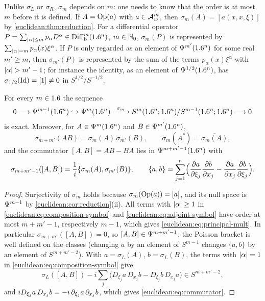 Unlike $\sigma_L$ or $\sigma_R$, $\sigma_m$ depends on $m$: one needs to
know that the order is at most $m$ before it is defined. If $A=\operatorname{Op}(a)$ with
$a\in\mathcal{A}^{m}_{w}$, then $\sigma_m(A)=[a(x,x,\xi)]$ by
\cref{euclidean:thm:reduction}. For a differential operator
$P=\sum_{\lvert \alpha\rvert\le m}p_\alpha D^\alpha\in\operatorname{Diff}^{m}_{\mathrm b}(1.6^n)$,
$m\in\mathbb{N}_0$, $\sigma_m(P)$ is represented by $\sum_{\lvert \alpha\rvert=m}p_\alpha(x)\xi^\alpha$.
If $P$ is only regarded as an element of $\Psi^{m'}(1.6^n)$ for some real
$m'\ge m$, then $\sigma_{m'}(P)$ is represented by the sum of the terms
$p_\alpha(x)\xi^\alpha$ with $\lvert \alpha\rvert>m'-1$; for instance the identity, as an
element of $\Psi^{1/2}(1.6^n)$, has $\sigma_{1/2}(\operatorname{Id})=[1]\ne0$ in
$S^{1/2}/S^{-1/2}$.

\begin{proposition}\label{euclidean:prop:symbol-sequence}
  For every $m\in1.6$ the sequence
  \begin{equation*}
    0\longrightarrow\Psido{m-1}(\R^n)\hookrightarrow\Psido m(\R^n)
    \xrightarrow{\ \sigma_m\ }S^m(\R^n;\R^n)/S^{m-1}(\R^n;\R^n)\longrightarrow0
  \end{equation*}
  is exact. Moreover, for $A\in\Psi^{m}(1.6^n)$ and $B\in\Psi^{m'}(1.6^n)$,
  \begin{equation}\label{euclidean:eq:principal-mult}
    \sigma_{m+m'}(AB)=\sigma_m(A)\,\sigma_{m'}(B),\qquad
    \sigma_m(A^*)=\overline{\sigma_m(A)},
  \end{equation}
  and the commutator $[A,B]=AB-BA$ lies in $\Psi^{m+m'-1}(1.6^n)$ with
  \begin{equation}\label{euclidean:eq:commutator}
    \sigma_{m+m'-1}([A,B])=\frac1i\{\sigma_m(A),\sigma_{m'}(B)\},\qquad
    \{a,b\}=\sum_{j=1}^n\Bigl(\frac{\partial a}{\partial\xi_j}\frac{\partial b}{\partial x_j}
    -\frac{\partial a}{\partial x_j}\frac{\partial b}{\partial\xi_j}\Bigr).
  \end{equation}
\end{proposition}
\begin{proof}
  Surjectivity of $\sigma_m$ holds because $\sigma_m(\operatorname{Op}(a))=[a]$, and its
  null space is $\Psi^{m-1}$ by \cref{euclidean:cor:reduction}(ii). All
  terms with $\lvert \alpha\rvert\ge1$ in \eqref{euclidean:eq:composition-symbol} and
  \eqref{euclidean:eq:adjoint-symbol} have order at most $m+m'-1$, respectively
  $m-1$, which gives \eqref{euclidean:eq:principal-mult}. In particular
  $\sigma_{m+m'}([A,B])=0$, so $[A,B]\in\Psi^{m+m'-1}$; the Poisson bracket
  is well defined on the classes (changing $a$ by an element of $S^{m-1}$
  changes $\{a,b\}$ by an element of $S^{m+m'-2}$). With $a=\sigma_L(A)$,
  $b=\sigma_L(B)$, the terms with $\lvert \alpha\rvert=1$ in
  \eqref{euclidean:eq:composition-symbol} give
  \begin{equation*}
    \sigma_L([A,B])-i\sum_j\bigl(D_{\xi_j}a\,D_{x_j}b-D_{\xi_j}b\,D_{x_j}a\bigr)
    \in S^{m+m'-2},
  \end{equation*}
  and $iD_{\xi_j}a\,D_{x_j}b=-i\,\partial_{\xi_j}a\,\partial_{x_j}b$, which gives
  \eqref{euclidean:eq:commutator}.
\end{proof}

